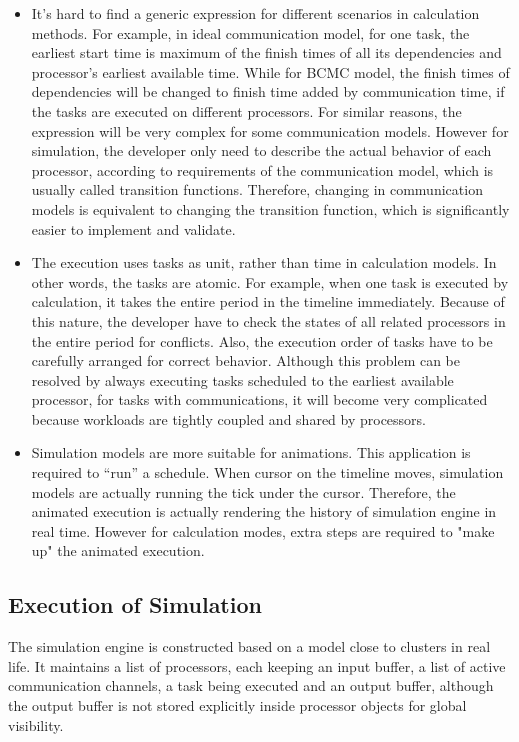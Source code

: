 \documentclass[msc,deptreport, cs]{infthesis}
\begin{document}
\begin{itemize}
  \item It's hard to find a generic expression for different scenarios in calculation methods. For example, in ideal communication model, for one task, the earliest start time is maximum of the finish times of all its dependencies and processor's earliest available time. While for BCMC model, the finish times of dependencies will be changed to finish time added by communication time, if the tasks are executed on different processors. For similar reasons, the expression will be very complex for some communication models. However for simulation, the developer only need to describe the actual behavior of each processor, according to requirements of the communication model, which is usually called transition functions. Therefore, changing in communication models is equivalent to changing the transition function, which is significantly easier to implement and validate.
  \item The execution uses tasks as unit, rather than time in calculation models. In other words, the tasks are atomic. For example, when one task is executed by calculation, it takes the entire period in the timeline immediately. Because of this nature, the developer have to check the states of all related processors in the entire period for conflicts. Also, the execution order of tasks have to be carefully arranged for correct behavior. Although this problem can be resolved by always executing tasks scheduled to the earliest available processor, for tasks with communications, it will become very complicated because workloads are tightly coupled and shared by processors.
  \item Simulation models are more suitable for animations. This application is required to ``run'' a schedule. When cursor on the timeline moves, simulation models are actually running the tick under the cursor. Therefore, the animated execution is actually rendering the history of simulation engine in real time. However for calculation modes, extra steps are required to "make up" the animated execution.
\end{itemize}

\subsection{Execution of Simulation} \label{sec:simulation}

The simulation engine is constructed based on a model close to clusters in real life. It maintains a list of processors, each keeping an input buffer, a list of active communication channels, a task being executed and an output buffer, although the output buffer is not stored explicitly inside processor objects for global visibility.
\end{document}
